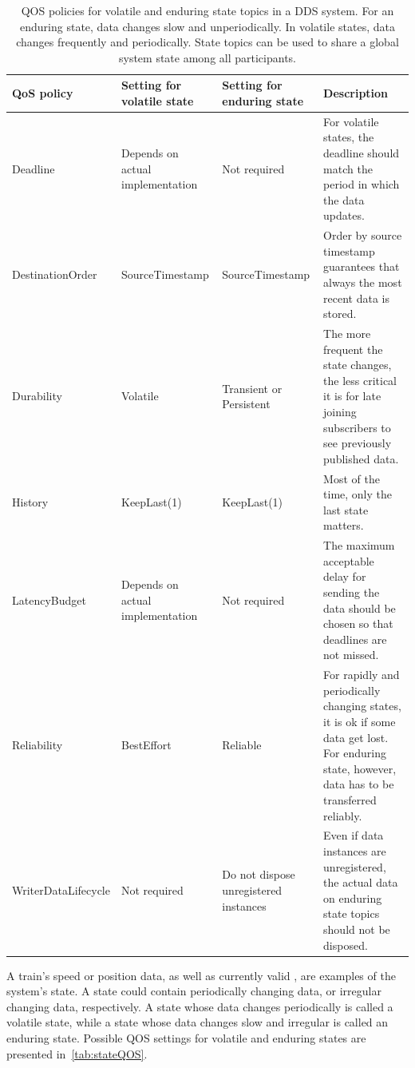 \begin{table}[htbp!]
	\begin{center}
		\caption{\Gls*{QOS} policies for volatile and enduring state topics in a \gls*{DDS} system. For an enduring state, data changes slow and unperiodically. In volatile states, data changes frequently and periodically. State topics can be used to share a global system state among all participants.}
		\label{tab:stateQOS}
		\begin{tabularx}{\textwidth}{|X|X|X|X|}
			\hline
			\textbf{QoS policy} & \textbf{Setting for volatile state} & \textbf{Setting for enduring state} & \textbf{Description}\\
			\hline \hline
			Deadline & Depends on actual implementation & Not required & For volatile states, the deadline should match the period in which the data updates. \\
			\hline
			DestinationOrder & SourceTimestamp & SourceTimestamp & Order by source timestamp guarantees that always the most recent data is stored. \\
			\hline
			Durability & Volatile & Transient or Persistent & The more frequent the state changes, the less critical it is for late joining subscribers to see previously published data. \\
			\hline
			History & KeepLast(1) & KeepLast(1) & Most of the time, only the last state matters. \\
			\hline
			LatencyBudget & Depends on actual implementation & Not required & The maximum acceptable delay for sending the data should be chosen so that deadlines are not missed. \\
			\hline
			Reliability & BestEffort & Reliable & For rapidly and periodically changing states, it is ok if some data get lost. For enduring state, however, data has to be transferred reliably. \\
			\hline
			WriterDataLifecycle & Not required & Do not dispose unregistered instances & Even if data instances are unregistered, the actual data on enduring state topics should not be disposed. \\
			\hline
		\end{tabularx}
	\end{center}
\end{table}

A train's speed or position data, as well as currently valid , are examples of the system's state.
A state could contain periodically changing data, or irregular changing data, respectively.
A state whose data changes periodically is called a volatile state, while a state whose data changes slow and irregular is called an enduring state.
Possible \gls*{QOS} settings for volatile and enduring states are presented in~\autoref{tab:stateQOS}.

